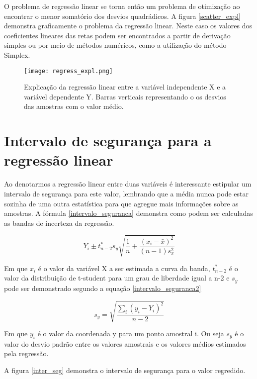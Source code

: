   
  O problema de regressão linear se torna então um problema de otimização ao encontrar o menor somatório dos desvios quadrádicos. A figura \eqref{scatter_expl} demonstra graficamente o problema da regressão linear. Neste caso os valores dos coeficientes lineares das retas podem ser encontrados a partir de derivação simples ou por meio de métodos numéricos, como a utilização do método Simplex.
  
   \begin{figure}[H]
   	\centering
   	\texttt{[image: regress\_expl.png]}	
   	\caption{Explicação da regressão linear entre a variável independente X e a variável dependente Y. Barras verticais representando o os desvios das amostras com o valor médio. }
   	\label{scatter_expl}
   \end{figure}
   
 \section{Intervalo de segurança para a regressão linear}
 
 Ao denotarmos a regressão linear entre duas variáveis é interessante estipular um intervalo de segurança para este valor, lembrando que a média  nunca pode estar sozinha de uma outra estatística para que agregue mais informações sobre as amostras. A fórmula \eqref{intervalo_seguranca} demonstra como podem ser calculadas as bandas de incerteza da regressão. 
 
 \begin{equation}\label{intervalo_seguranca}
	 Y_{i} \pm  t^{*}_{n-2} s_{y} \sqrt{\frac{1}{n}+\frac{(x_{i}-\bar{x})^2}{(n-1)s^2_{x}}}
 \end{equation}
 
 Em que $x_{i}$ é o valor da variável X a ser estimada a curva da banda, $t^*_{n-2}$ é o valor da distribuição de t-student para um grau de liberdade igual a n-2 e $s_{y}$ pode ser demonstrado segundo a equação \eqref{intervalo_seguranca2}
 
  \begin{equation}\label{intervalo_seguranca2}
  s_{y} = \sqrt{\frac{\sum_{i}(y_{i}-Y_{i})^2}{n-2}}
  \end{equation}
   
  Em que $y_{i}$ é o valor da coordenada y para um ponto amostral i. Ou seja $s_{y}$ é o valor do desvio padrão entre os valores amostrais e os valores médios estimados pela regressão. 
  
  A figura \eqref{inter_seg} demonstra o intervalo de segurança para o valor regredido. 
  
